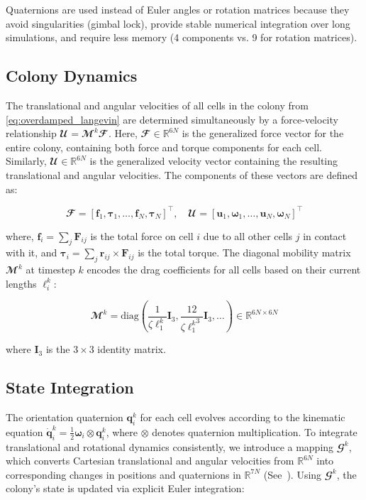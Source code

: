 \documentclass[conference]{IEEEtran}
\begin{document}
Quaternions are used instead of Euler angles or rotation matrices because they avoid singularities (gimbal lock), provide stable numerical integration over long simulations, and require less memory (4 components vs. 9 for rotation matrices).

\subsection{Colony Dynamics}

The translational and angular velocities of all cells in the colony from \autoref{eq:overdamped_langevin} are determined simultaneously by a force-velocity relationship $\mathbfcal{U} = \mathbfcal{M}^k \mathbfcal{F}$. Here, $\mathbfcal{F} \in \mathbb{R}^{6N}$ is the generalized force vector for the entire colony, containing both force and torque components for each cell. Similarly, $\mathbfcal{U} \in \mathbb{R}^{6N}$ is the generalized velocity vector containing the resulting translational and angular velocities. The components of these vectors are defined as:

\begin{equation}
    \mathbfcal{F} = [\mathbf{f}_1, \boldsymbol{\tau}_1, \dots, \mathbf{f}_N, \boldsymbol{\tau}_N]^\top, \quad
    \mathbfcal{U} = [\mathbf{u}_1, \boldsymbol{\omega}_1, \dots, \mathbf{u}_N, \boldsymbol{\omega}_N]^\top
\end{equation}

where, $\mathbf{f}_i = \sum_j \mathbf{F}_{ij}$ is the total force on cell $i$ due to all other cells $j$ in contact with it, and $\boldsymbol{\tau}_i = \sum_j \mathbf{r}_{ij} \times \mathbf{F}_{ij}$ is the total torque. The diagonal mobility matrix $\mathbfcal{M}^k$ at timestep $k$ encodes the drag coefficients for all cells based on their current lengths $\ell_i^k$:

\begin{equation}
    \mathbfcal{M}^k = \text{diag}\left(\frac{1}{\zeta \ell_1^k}\mathbf{I}_3, \frac{12}{\zeta {\ell_1^k}^3}\mathbf{I}_3, \dots \right) \in \mathbb{R}^{6N \times 6N}
\end{equation}

where $\mathbf{I}_3$ is the $3 \times 3$ identity matrix.

\subsection{State Integration}

The orientation quaternion $\mathbf{q}_i^k$ for each cell evolves according to the kinematic equation $\dot{\mathbf{q}}_i^k = \frac{1}{2} \boldsymbol{\omega}_i \otimes \mathbf{q}_i^k$, where $\otimes$ denotes quaternion multiplication. To integrate translational and rotational dynamics consistently, we introduce a mapping $\mathbfcal{G}^k$, which converts Cartesian translational and angular velocities from $\mathbb{R}^{6N}$ into corresponding changes in positions and quaternions in $\mathbb{R}^{7N}$ (See~\cite{Weady2024SM,Yan2022,Tasora2008}). Using $\mathbfcal{G}^k$, the colony's state is updated via explicit Euler integration:
\end{document}
